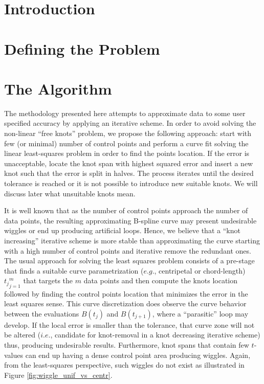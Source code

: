 \documentclass[a4paper,10pt]{article}
\author{Julia Docampo}
\begin{document}
 
 
 \section{Introduction}
 \section{Defining the Problem}
 \section{The Algorithm}
 The methodology presented here attempts to approximate data to some user specified accuracy by applying an iterative scheme. 
In order to avoid solving the non-linear ``free knots'' problem, we propose the following approach: start with few (or minimal) number of control points and perform a curve fit solving the linear least-squares problem in order to find 
the points location. If the error is unacceptable, locate the knot span with highest squared error and insert a  new knot such that the error is split in halves. The process iterates until the desired tolerance is reached or it is not 
possible to introduce new suitable knots. We will discuss later what unsuitable knots mean. 

It is well known that as the number of control points approach the number of data points, the resulting approximating B-spline curve may present undesirable wiggles or end up producing artificial loops. Hence, we believe that 
a ``knot increasing'' iterative scheme is more stable than approximating the curve starting with a high number of control points and iterative remove the redundant ones. 
The usual approach for solving the least squares problem consists of a pre-stage that finds a suitable curve parametrization ($e.g.$, centripetal or chord-length)  ${t_j}_{j=1}^m$ that targets the $m$ data points and
then compute the knots location followed by finding the control points location that minimizes the error in the least squares sense. 
This curve discretization does observe the curve behavior between the evaluations $B(t_j)$ and $B(t_{j+1})$, where a ``parasitic'' loop may develop. If the local error is smaller than the tolerance, that 
curve zone will not be altered ($i.e.$, candidate for knot-removal in a knot decreasing iterative scheme) thus, producing undesirable results. Furthermore, knot spans that contain few $t$-values can end up having a dense control point area 
producing wiggles. Again, from the least-squares perspective, such wiggles do not exist as illustrated in Figure \ref{fig:wiggle_unif_vs_centr}.
\end{document}
